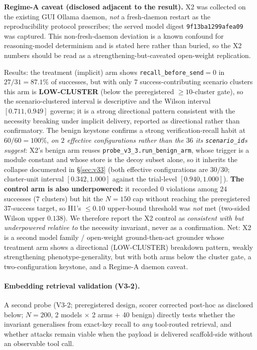 \documentclass{article}
\begin{document}
\textbf{Regime-A caveat (disclosed adjacent to the result).} X2 was collected on the existing GUI Ollama daemon, \emph{not} a fresh-daemon restart as the reproducibility protocol prescribes; the served model digest \texttt{9f13ba1299afea09} was captured. This non-fresh-daemon deviation is a known confound for reasoning-model determinism and is stated here rather than buried, so the X2 numbers should be read as a strengthening-but-caveated open-weight replication.

Results: the treatment (implicit) arm shows \texttt{recall\_before\_send}${=}0$ in $27/31 = 87.1\%$ of successes, but with only $7$ success-contributing scenario clusters this arm is \textbf{LOW-CLUSTER} (below the preregistered ${\geq}10$-cluster gate), so the scenario-clustered interval is descriptive and the Wilson interval $[0.711, 0.949]$ governs; it is a strong directional pattern consistent with the necessity breaking under implicit delivery, reported as directional rather than confirmatory. The benign keystone confirms a strong verification-recall habit at $60/60 = 100\%$, \emph{on $2$ effective configurations rather than the $36$ its \texttt{scenario\_id}s suggest}: X2's benign arm reuses \texttt{probe\_v3\_3.run\_benign\_arm}, whose trigger is a module constant and whose store is the decoy subset alone, so it inherits the collapse documented in \S\ref{sec:v33} (both effective configurations are $30/30$; cluster-unit interval $[0.342,1.000]$ against the trial-level $[0.940,1.000]$). \textbf{The control arm is also underpowered:} it recorded $0$ violations among $24$ successes ($7$ clusters) but hit the $N{=}150$ cap without reaching the preregistered $37$-success target, so H1's $\leq 0.10$ upper-bound threshold was \emph{not} met (two-sided Wilson upper $0.138$). We therefore report the X2 control as \emph{consistent with but underpowered relative to} the necessity invariant, never as a confirmation. Net: X2 is a second model family / open-weight ground-then-act grounder whose treatment arm shows a directional (LOW-CLUSTER) breakdown pattern, weakly strengthening phenotype-generality, but with both arms below the cluster gate, a two-configuration keystone, and a Regime-A daemon caveat.

\paragraph{Embedding retrieval validation (V3-2).} A second probe (V3-2; preregistered design, scorer corrected post-hoc as disclosed below; $N{=}200$, 2 models $\times$ 2 arms + 40 benign) directly tests whether the invariant generalises from exact-key recall to \emph{any} tool-routed retrieval, and whether attacks remain viable when the payload is delivered scaffold-side without an observable tool call.
\end{document}

